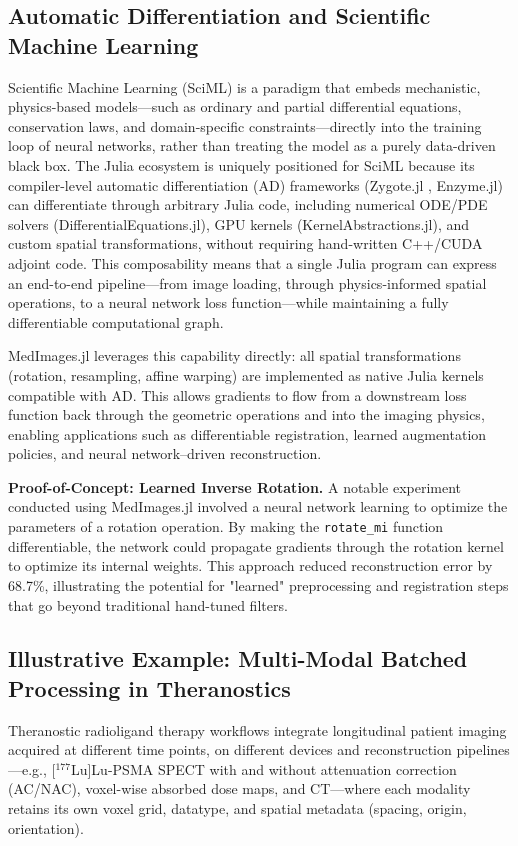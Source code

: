 \documentclass[10pt,letterpaper]{article}
\begin{document}
\subsection*{Automatic Differentiation and Scientific Machine Learning}
Scientific Machine Learning (SciML) is a paradigm that embeds mechanistic, physics-based models---such as ordinary and partial differential equations, conservation laws, and domain-specific constraints---directly into the training loop of neural networks, rather than treating the model as a purely data-driven black box. The Julia ecosystem is uniquely positioned for SciML because its compiler-level automatic differentiation (AD) frameworks (Zygote.jl \cite{Fischer_2019}, Enzyme.jl) can differentiate through arbitrary Julia code, including numerical ODE/PDE solvers (DifferentialEquations.jl), GPU kernels (KernelAbstractions.jl), and custom spatial transformations, without requiring hand-written C++/CUDA adjoint code. This composability means that a single Julia program can express an end-to-end pipeline---from image loading, through physics-informed spatial operations, to a neural network loss function---while maintaining a fully differentiable computational graph.

MedImages.jl leverages this capability directly: all spatial transformations (rotation, resampling, affine warping) are implemented as native Julia kernels compatible with AD. This allows gradients to flow from a downstream loss function back through the geometric operations and into the imaging physics, enabling applications such as differentiable registration, learned augmentation policies, and neural network--driven reconstruction.


\textbf{Proof-of-Concept: Learned Inverse Rotation.} A notable experiment conducted using MedImages.jl involved a neural network learning to optimize the parameters of a rotation operation. By making the \texttt{rotate\_mi} function differentiable, the network could propagate gradients through the rotation kernel to optimize its internal weights. This approach reduced reconstruction error by 68.7\%, illustrating the potential for "learned" preprocessing and registration steps that go beyond traditional hand-tuned filters.

\subsection*{Illustrative Example: Multi-Modal Batched Processing in Theranostics}
Theranostic radioligand therapy workflows integrate longitudinal patient imaging acquired at different time points, on different devices and reconstruction pipelines---e.g., [$^{177}$Lu]Lu-PSMA SPECT with and without attenuation correction (AC/NAC), voxel-wise absorbed dose maps, and CT---where each modality retains its own voxel grid, datatype, and spatial metadata (spacing, origin, orientation).  
\end{document}
